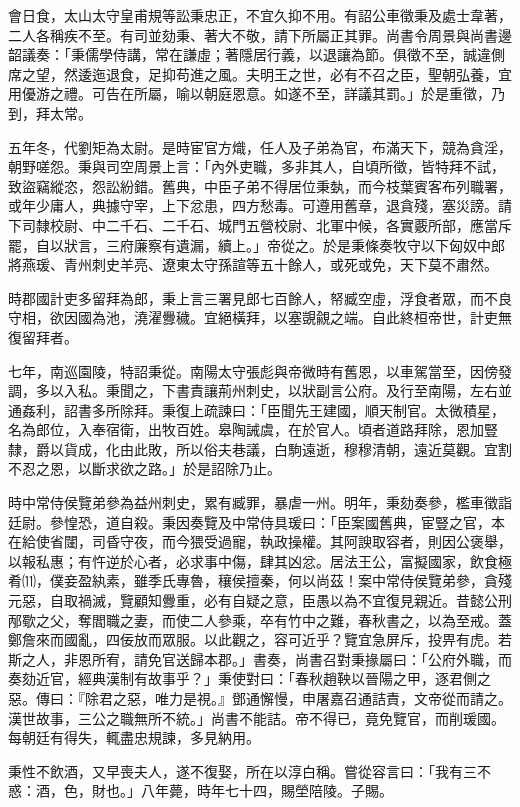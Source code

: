 \begin{pinyinscope}
會日食，太山太守皇甫規等訟秉忠正，不宜久抑不用。有詔公車徵秉及處士韋著，二人各稱疾不至。有司並劾秉、著大不敬，請下所屬正其罪。尚書令周景與尚書邊韶議奏：「秉儒學侍講，常在謙虛；著隱居行義，以退讓為節。俱徵不至，誠違側席之望，然逶迤退食，足抑苟進之風。夫明王之世，必有不召之臣，聖朝弘養，宜用優游之禮。可告在所屬，喻以朝庭恩意。如遂不至，詳議其罰。」於是重徵，乃到，拜太常。

五年冬，代劉矩為太尉。是時宦官方熾，任人及子弟為官，布滿天下，競為貪淫，朝野嗟怨。秉與司空周景上言：「內外吏職，多非其人，自頃所徵，皆特拜不試，致盜竊縱恣，怨訟紛錯。舊典，中臣子弟不得居位秉埶，而今枝葉賓客布列職署，或年少庸人，典據守宰，上下忿患，四方愁毒。可遵用舊章，退貪殘，塞災謗。請下司隸校尉、中二千石、二千石、城門五營校尉、北軍中候，各實覈所部，應當斥罷，自以狀言，三府廉察有遺漏，續上。」帝從之。於是秉條奏牧守以下匈奴中郎將燕瑗、青州刺史羊亮、遼東太守孫諠等五十餘人，或死或免，天下莫不肅然。

時郡國計吏多留拜為郎，秉上言三署見郎七百餘人，帑臧空虛，浮食者眾，而不良守相，欲因國為池，澆濯釁穢。宜絕橫拜，以塞覬覦之端。自此終桓帝世，計吏無復留拜者。

七年，南巡園陵，特詔秉從。南陽太守張彪與帝微時有舊恩，以車駕當至，因傍發調，多以入私。秉聞之，下書責讓荊州刺史，以狀副言公府。及行至南陽，左右並通姦利，詔書多所除拜。秉復上疏諫曰：「臣聞先王建國，順天制官。太微積星，名為郎位，入奉宿衛，出牧百姓。皋陶誡虞，在於官人。頃者道路拜除，恩加豎隸，爵以貨成，化由此敗，所以俗夫巷議，白駒遠逝，穆穆清朝，遠近莫觀。宜割不忍之恩，以斷求欲之路。」於是詔除乃止。

時中常侍侯覽弟參為益州刺史，累有臧罪，暴虐一州。明年，秉劾奏參，檻車徵詣廷尉。參惶恐，道自殺。秉因奏覽及中常侍具瑗曰：「臣案國舊典，宦豎之官，本在給使省闥，司昏守夜，而今猥受過寵，執政操權。其阿諛取容者，則因公褒舉，以報私惠；有忤逆於心者，必求事中傷，肆其凶忿。居法王公，富擬國家，飲食極肴⑾，僕妾盈紈素，雖季氏專魯，穰侯擅秦，何以尚茲！案中常侍侯覽弟參，貪殘元惡，自取禍滅，覽顧知釁重，必有自疑之意，臣愚以為不宜復見親近。昔懿公刑邴歜之父，奪閻職之妻，而使二人參乘，卒有竹中之難，春秋書之，以為至戒。蓋鄭詹來而國亂，四佞放而眾服。以此觀之，容可近乎？覽宜急屏斥，投畀有虎。若斯之人，非恩所宥，請免官送歸本郡。」書奏，尚書召對秉掾屬曰：「公府外職，而奏劾近官，經典漢制有故事乎？」秉使對曰：「春秋趙鞅以晉陽之甲，逐君側之惡。傳曰：『除君之惡，唯力是視。』鄧通懈慢，申屠嘉召通詰責，文帝從而請之。漢世故事，三公之職無所不統。」尚書不能詰。帝不得已，竟免覽官，而削瑗國。每朝廷有得失，輒盡忠規諫，多見納用。

秉性不飲酒，又早喪夫人，遂不復娶，所在以淳白稱。嘗從容言曰：「我有三不惑：酒，色，財也。」八年薨，時年七十四，賜塋陪陵。子賜。


\end{pinyinscope}
